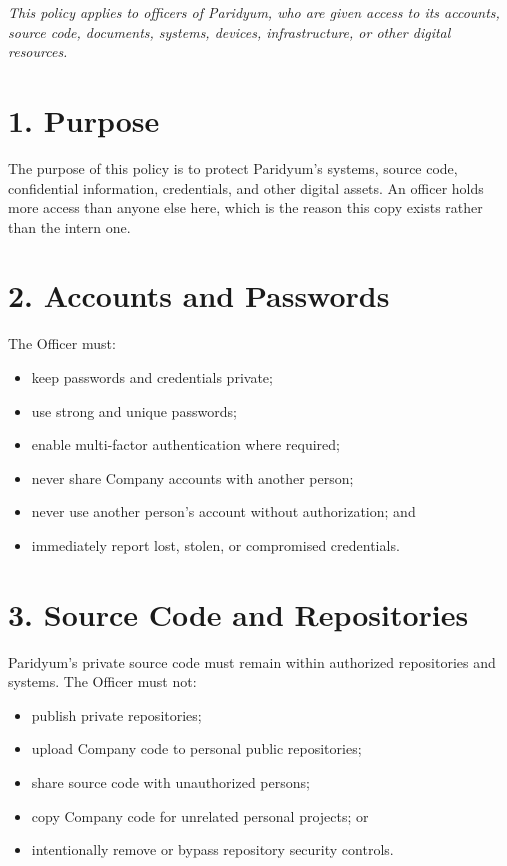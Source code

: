 \documentclass{paridyum}
\begin{document}
\paridyumletterhead
\paridyumdateref{\dkDocDate}{\dkDocRef}

\textit{This policy applies to officers of Paridyum, who are given access to its accounts,
source code, documents, systems, devices, infrastructure, or other digital resources.}

\section*{1. Purpose}
The purpose of this policy is to protect Paridyum's systems, source code, confidential
information, credentials, and other digital assets. An officer holds more access than
anyone else here, which is the reason this copy exists rather than the intern one.

\section*{2. Accounts and Passwords}
The Officer must:
\begin{itemize}[leftmargin=*, noitemsep]
    \item keep passwords and credentials private;
    \item use strong and unique passwords;
    \item enable multi-factor authentication where required;
    \item never share Company accounts with another person;
    \item never use another person's account without authorization; and
    \item immediately report lost, stolen, or compromised credentials.
\end{itemize}

\section*{3. Source Code and Repositories}
Paridyum's private source code must remain within authorized repositories and systems.
The Officer must not:
\begin{itemize}[leftmargin=*, noitemsep]
    \item publish private repositories;
    \item upload Company code to personal public repositories;
    \item share source code with unauthorized persons;
    \item copy Company code for unrelated personal projects; or
    \item intentionally remove or bypass repository security controls.
\end{itemize}
\end{document}
